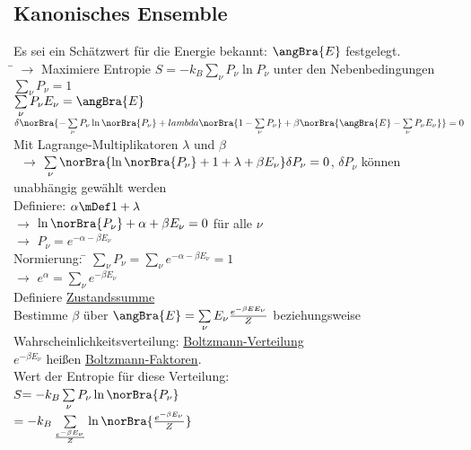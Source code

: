 \subsection{Kanonisches Ensemble}
\label{sec:Kanonisch}
\begin{tabbing}
Es sei ein Schätzwert für die Energie bekannt: $\angBra{E}$ festgelegt.\\
\hspace{4em} \= \kill
$\rightarrow$\> Maximiere Entropie $S = -k_B \sum\limits_{\nu} P_{\nu} \ln P_{\nu}$ unter den Nebenbedingungen\\
\> $\sum\limits_\nu P_\nu = 1$\\
\> $\sum\limits_\nu P_\nu E_\nu = \angBra{E}$\\
$\delta\norBra{-\sum\limits_\nu P_\nu \ln\norBra{P_\nu} + lambda\norBra{1-\sum\limits_\nu P_\nu} + \beta\norBra{\angBra{E} - \sum\limits_\nu P_\nu E_\nu}} = 0$\\
Mit Lagrange-Multiplikatoren $\lambda$ und $\beta$\\\
$\rightarrow$\> $\sum\limits_\nu\norBra{\ln\norBra{P_\nu} + 1 + \lambda + \beta E_\nu}\delta P_\nu = 0$, $\delta P_\nu$ können unabhängig gewählt werden\\
Definiere: $\alpha \mDef 1 + \lambda$\\
$\rightarrow$\> $\ln\norBra{P_\nu} + \alpha + \beta E_\nu = 0$ für alle $\nu$\\
$\rightarrow$\> $P_\nu = e^{-\alpha - \beta E_\nu}$\\
Normierung: \= $\sum\limits_\nu P_\nu = \sum\limits_\nu e^{-\alpha-\beta E_\nu} = 1$\\
$\rightarrow$\> $e^\alpha = \sum\limits_\nu e^{-\beta E_\nu}$\\
Definiere \uline{Zustandssumme} \\
Bestimme $\beta$ über $\angBra{E} = \sum\limits_\nu E_\nu \frac{e^{-\beta EE_\nu}}{Z}$ beziehungsweise \\
Wahrscheinlichkeitsverteilung: \fbox{$P_\nu = \frac{1}{Z} e^{-\beta E_\nu}$} \uline{Boltzmann-Verteilung}\\
$e^{-\beta E_\nu}$ heißen \uline{Boltzmann-Faktoren}.\\
Wert der Entropie für diese Verteilung:\\
$S$\=$=-k_B \sum\limits_\nu P_\nu \ln\norBra{P_\nu}$\\
\>$=-k_B \sum\limits_ \frac{e^{-\beta E_\nu}}{Z} \ln\norBra{\frac{e^{-\beta E_\nu}}{Z}}$\\

\end{tabbing}
